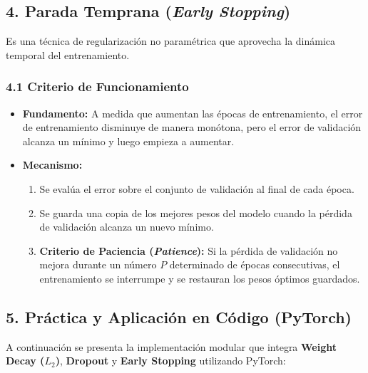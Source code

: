 \subsection{4. Parada Temprana (\emph{Early Stopping})}

Es una técnica de regularización no paramétrica que aprovecha la dinámica temporal del entrenamiento.

\subsubsection{4.1 Criterio de Funcionamiento}

\begin{itemize}
	\item \textbf{Fundamento:} A medida que aumentan las épocas de entrenamiento, el error de entrenamiento disminuye de manera monótona, pero el error de validación alcanza un mínimo y luego empieza a aumentar.
	
	\item \textbf{Mecanismo:}
	\begin{enumerate}
		\item Se evalúa el error sobre el conjunto de validación al final de cada época.
		\item Se guarda una copia de los mejores pesos del modelo cuando la pérdida de validación alcanza un nuevo mínimo.
		\item \textbf{Criterio de Paciencia (\emph{Patience}):} Si la pérdida de validación no mejora durante un número $P$ determinado de épocas consecutivas, el entrenamiento se interrumpe y se restauran los pesos óptimos guardados.
	\end{enumerate}
\end{itemize}

\subsection{5. Práctica y Aplicación en Código (PyTorch)}

A continuación se presenta la implementación modular que integra \textbf{Weight Decay ($L_2$)}, \textbf{Dropout} y \textbf{Early Stopping} utilizando PyTorch:

